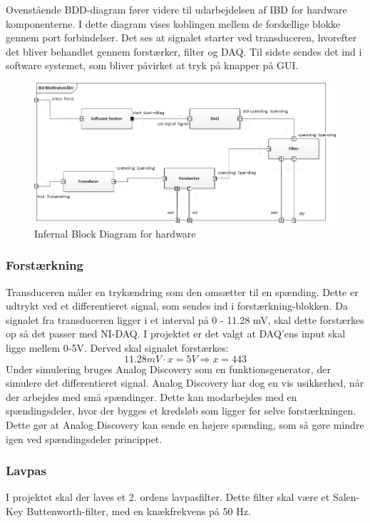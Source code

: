 Ovenstående BDD-diagram fører videre til udarbejdelsen af IBD for hardware komponenterne. I dette diagram vises koblingen mellem de forskellige blokke gennem port forbindelser.  Det ses at signalet starter ved transduceren, hvorefter det bliver behandlet gennem forstærker, filter og DAQ. Til sidste sendes det ind i software systemet, som bliver påvirket at tryk på knapper på GUI. 

\begin{figure}[htb]
	\centering
	\includegraphics[width=1.0\textwidth]{Figurer/IBD}
	\caption{Infernal Block Diagram for hardware}
	\label{fig:IBD viser koblingen mellem blodtrykssystemets hardwaredele}
\end{figure}

\subsubsection{Forstærkning}
Transduceren måler en trykændring som den omsætter til en spænding. Dette er udtrykt ved et differentieret signal, som sendes ind i forstærkning-blokken. Da signalet fra transduceren ligger i et interval på 0 - 11.28 mV,  skal dette forstærkes op så det passer med NI-DAQ. I projektet er det valgt at DAQ'ens input skal ligge mellem 0-5V. Derved skal signalet forstærkes: 
\begin{equation}
11.28mV\cdot x = 5 V \Rightarrow x= 443
\end{equation}
Under simulering bruges Analog Discovery som en funktionsgenerator, der simulere det differentieret signal. Analog Discovery har dog en vis usikkerhed, når der arbejdes med små spændinger. Dette kan modarbejdes med en spændingsdeler, hvor der bygges et kredsløb som ligger før selve forstærkningen. Dette gør at Analog Discovery kan sende en højere spænding, som så gøre mindre igen ved spændingsdeler princippet.  

\subsubsection{Lavpas}
I projektet skal der laves et 2. ordens lavpasfilter. Dette filter skal være et Salen-Key Buttenworth-filter, med en knækfrekvens på 50 Hz. 

